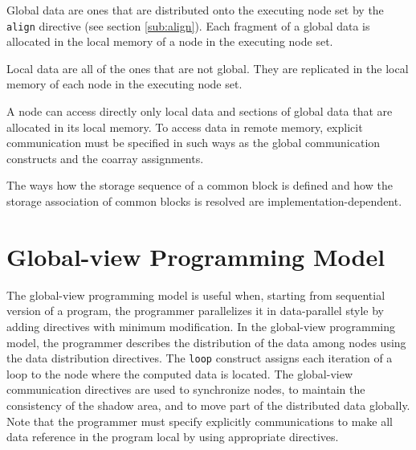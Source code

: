 Global data are ones that are distributed onto the executing node set by
the {\tt align} directive (see section \ref{sub:align}). Each fragment
of a global data is allocated in the local memory of a node in the
executing node set.
%
%

Local data are all of the ones that are not global. They are replicated
in the local memory of each node in the executing node set.


A node can access directly only local data and sections of global data
that are allocated in its local memory.
%
To access data in remote memory, explicit communication must be
specified in such ways as the global communication constructs and
the coarray assignments.

The ways how the storage sequence of a common block is defined and how
the storage association of common blocks is resolved are
implementation-dependent.


\section{Global-view Programming Model}

The global-view programming model is useful when, starting from
sequential version of a program, the programmer parallelizes it in
data-parallel style by adding directives with minimum modification.
%
In the global-view programming model, the programmer describes the
distribution of the data among nodes using the data distribution
directives.
%
The {\tt loop} construct assigns each iteration of a loop to the node
where the computed data is located. 
%
The global-view communication directives are used to synchronize nodes,
to maintain the consistency of the shadow area, and to move part of the
distributed data globally.
%
Note that the programmer must specify explicitly communications to make
all data reference in the program local by using appropriate directives.

